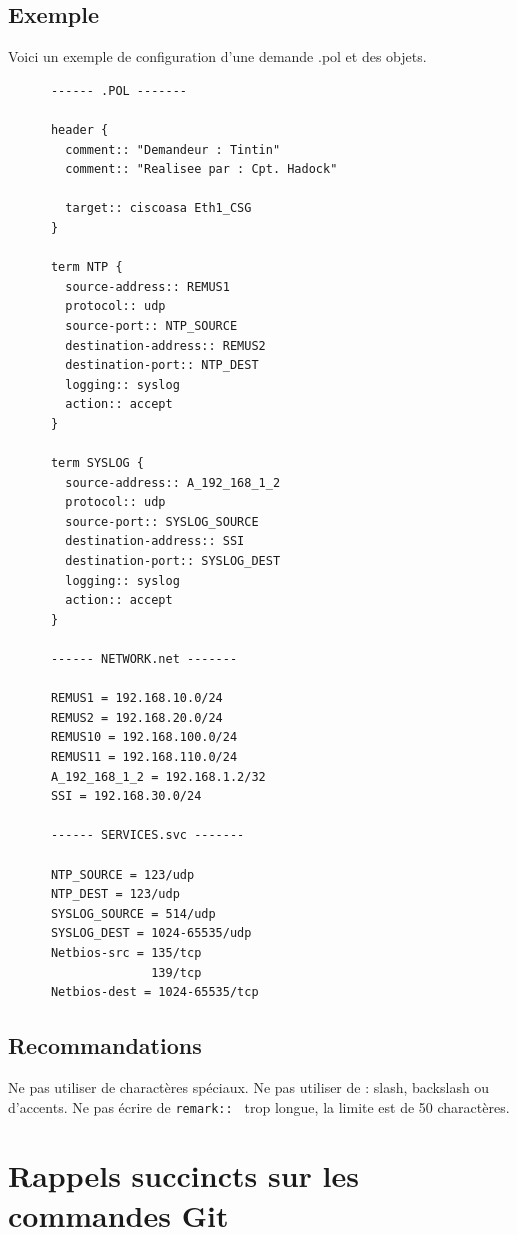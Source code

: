 \documentclass{article}
\begin{document}
    \subsection{Exemple}

      \noindent Voici un exemple de configuration d'une demande .pol et des objets. \smallbreak
\begin{verbatim}
      ------ .POL -------

      header {
        comment:: "Demandeur : Tintin"
        comment:: "Realisee par : Cpt. Hadock"

        target:: ciscoasa Eth1_CSG
      }

      term NTP {
        source-address:: REMUS1
        protocol:: udp
        source-port:: NTP_SOURCE
        destination-address:: REMUS2
        destination-port:: NTP_DEST
        logging:: syslog
        action:: accept
      }

      term SYSLOG {
        source-address:: A_192_168_1_2
        protocol:: udp
        source-port:: SYSLOG_SOURCE
        destination-address:: SSI
        destination-port:: SYSLOG_DEST
        logging:: syslog
        action:: accept
      }

      ------ NETWORK.net -------

      REMUS1 = 192.168.10.0/24
      REMUS2 = 192.168.20.0/24
      REMUS10 = 192.168.100.0/24
      REMUS11 = 192.168.110.0/24
      A_192_168_1_2 = 192.168.1.2/32
      SSI = 192.168.30.0/24

      ------ SERVICES.svc -------

      NTP_SOURCE = 123/udp
      NTP_DEST = 123/udp
      SYSLOG_SOURCE = 514/udp
      SYSLOG_DEST = 1024-65535/udp
      Netbios-src = 135/tcp
                    139/tcp
      Netbios-dest = 1024-65535/tcp
\end{verbatim}

    \subsection{Recommandations}

      \noindent Ne pas utiliser de charactères spéciaux.
      Ne pas utiliser de : slash, backslash ou d'accents.
      Ne pas écrire de \texttt{remark:: } trop longue, la limite est de 50 charactères.


  \section{Rappels succincts sur les commandes Git}
\end{document}
